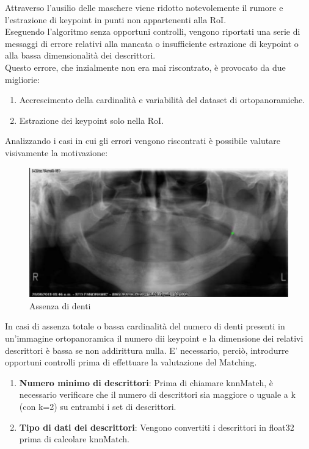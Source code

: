 \documentclass[12pt,a4paper,openright,twoside]{book}
\begin{document}
Attraverso l'ausilio delle maschere viene ridotto notevolemente il rumore e l'estrazione di keypoint in punti non appartenenti alla RoI.\\
Eseguendo l'algoritmo senza opportuni controlli, vengono riportati una serie di messaggi di errore relativi alla mancata o insufficiente estrazione di keypoint o alla bassa dimensionalità dei descrittori.\\
Questo errore, che inzialmente non era mai riscontrato, è provocato da due migliorie:
\begin{enumerate}
\item Accrescimento della cardinalità e variabilità del dataset di ortopanoramiche.
\item Estrazione dei keypoint solo nella RoI.
\end{enumerate}

Analizzando i casi in cui gli errori vengono riscontrati è possibile valutare visivamente la motivazione:
\begin{figure}[H]
  	\centering
	\includegraphics{figures/nodenti.pdf}
   	\caption{Assenza di denti}
	\label{fig:nodenti}
\end{figure} 

In casi di assenza totale o bassa cardinalità del numero di denti presenti in un'immagine ortopanoramica il numero dii keypoint e la dimensione dei relativi descrittori è bassa se non addirittura nulla. E' necessario, perciò, introdurre opportuni controlli prima di effettuare la valutazione del Matching.\\

\begin{figure}[H]
	\centering
    	
\end{figure} 

\begin{enumerate}
\item \textbf{Numero minimo di descrittori}: Prima di chiamare knnMatch, è necessario verificare che il numero di descrittori sia maggiore o uguale a k (con k=2) su entrambi i set di descrittori.
\item \textbf{Tipo di dati dei descrittori}: Vengono convertiti i descrittori in float32 prima di calcolare knnMatch.
\end{enumerate}
\end{document}
